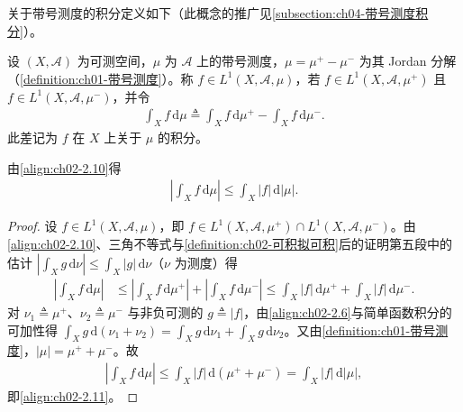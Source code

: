 \documentclass[../../main.tex]{subfiles}%
\begin{document}
关于带号测度的积分定义如下（此概念的推广见\cref{subsection:ch04-带号测度积分}）。

\begin{definition}\label{definition:ch02-带号测度积分}\label{definition:ch02-带号积分}
设 $(X,\mathscr A)$ 为可测空间，$\mu$ 为 $\mathscr A$ 上的带号测度，$\mu=\mu^+-\mu^-$ 为其 Jordan 分解（\cref{definition:ch01-带号测度}）。称 $f\in L^1(X,\mathscr A,\mu)$，若 $f\in L^1(X,\mathscr A,\mu^+)$ 且 $f\in L^1(X,\mathscr A,\mu^-)$，并令
\begin{align}
\int_Xf\,\mathrm{d}\mu\triangleq\int_Xf\,\mathrm{d}\mu^+-\int_Xf\,\mathrm{d}\mu^-. \label{align:ch02-2.10}
\end{align}
此差记为 $f$ 在 $X$ 上关于 $\mu$ 的积分。
\end{definition}

由\eqref{align:ch02-2.10}得
\begin{align}
\left|\int_Xf\,\mathrm{d}\mu\right|\leqslant\int_X|f|\,\mathrm{d}|\mu|. \label{align:ch02-2.11}
\end{align}

\begin{proof}
设 $f\in L^1(X,\mathscr A,\mu)$，即 $f\in L^1(X,\mathscr A,\mu^+)\cap L^1(X,\mathscr A,\mu^-)$。由\eqref{align:ch02-2.10}、三角不等式与\cref{definition:ch02-可积拟可积}后的证明第五段中的估计 $\left|\int_Xg\,\mathrm{d}\nu\right|\leqslant\int_X|g|\,\mathrm{d}\nu$（$\nu$ 为测度）得
\begin{align*}
\left|\int_Xf\,\mathrm{d}\mu\right|
&\leqslant\left|\int_Xf\,\mathrm{d}\mu^+\right|+\left|\int_Xf\,\mathrm{d}\mu^-\right|
\leqslant\int_X|f|\,\mathrm{d}\mu^++\int_X|f|\,\mathrm{d}\mu^-.
\end{align*}
对 $\nu_1\triangleq\mu^+$、$\nu_2\triangleq\mu^-$ 与非负可测的 $g\triangleq|f|$，由\eqref{align:ch02-2.6}与简单函数积分的可加性得 $\int_Xg\,\mathrm{d}(\nu_1+\nu_2)=\int_Xg\,\mathrm{d}\nu_1+\int_Xg\,\mathrm{d}\nu_2$。又由\cref{definition:ch01-带号测度}，$|\mu|=\mu^++\mu^-$。故
\begin{align*}
\left|\int_Xf\,\mathrm{d}\mu\right|\leqslant\int_X|f|\,\mathrm{d}(\mu^++\mu^-)=\int_X|f|\,\mathrm{d}|\mu|,
\end{align*}
即\eqref{align:ch02-2.11}。
\end{proof}
\end{document}
